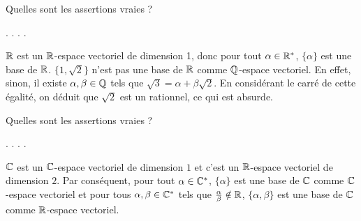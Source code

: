 \begin{question}
Quelles sont les assertions vraies ?
\begin{answers}  
.
.
.
.
\end{answers}
\begin{explanations} $\mathbb{R}$ est un  $\mathbb{R}$-espace vectoriel de dimension 1, donc pour tout $\alpha \in \mathbb{R}^*$, $\{\alpha\}$ 
est une base de $\mathbb{R}$.
\vskip2mm
$\{1, \sqrt 2\}$ n'est pas une base de $\mathbb{R}$ comme  $\mathbb{Q}$-espace vectoriel. En effet, sinon, il existe $\alpha, \beta \in \mathbb{Q}$ tels que $\sqrt 3= \alpha+ \beta \sqrt 2$. En considérant le carré de cette égalité, on déduit que $\sqrt 2$ est un rationnel, ce qui est absurde.
\end{explanations}
\end{question}

\begin{question}
Quelles sont les assertions vraies ?
\begin{answers}  
.
.
.
.
\end{answers}
\begin{explanations}  $\mathbb{C}$ est un $\mathbb{C}$-espace vectoriel de dimension $1$ et c'est un $\mathbb{R}$-espace vectoriel de dimension $2$. Par conséquent, pour tout $\alpha \in \mathbb{C}^*$, $\{\alpha\}$ est une base de $\mathbb{C}$ comme $\mathbb{C}$-espace vectoriel et  pour tous $\alpha, \beta \in \mathbb{C}^*$ tels que $\frac{\alpha}{\beta} \notin \mathbb{R}$,  $\{\alpha, \beta\}$ est une base de $\mathbb{C}$ comme $\mathbb{R}$-espace vectoriel. 
\end{explanations}
\end{question}


